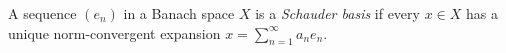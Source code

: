 
A sequence $(e_n)$ in a Banach space $X$ is a \emph{Schauder basis} if every $x\in X$ has a unique norm-convergent expansion $x=\sum_{n=1}^{\infty}a_ne_n$.
